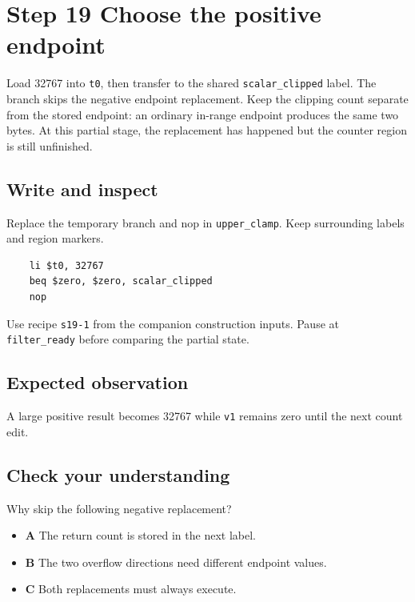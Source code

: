 \section{Step 19 Choose the positive endpoint}\label{fir-s19}

Load 32767 into \texttt{t0}, then transfer to the shared \texttt{scalar\_clipped} label. The branch skips the negative endpoint replacement. Keep the clipping count separate from the stored endpoint: an ordinary in-range endpoint produces the same two bytes. At this partial stage, the replacement has happened but the counter region is still unfinished.

\subsection{Write and inspect}
Replace the temporary branch and nop in \texttt{upper\_clamp}. Keep surrounding labels and region markers.

\begin{verbatim}
    li $t0, 32767
    beq $zero, $zero, scalar_clipped
    nop
\end{verbatim}
Use recipe \texttt{s19-1} from the companion construction inputs. Pause at \texttt{filter\_ready} before comparing the partial state.

\subsection{Expected observation}
A large positive result becomes 32767 while \texttt{v1} remains zero until the next count edit.

\subsection{Check your understanding}
Why skip the following negative replacement?

\begin{itemize}
  \item \textbf{A} The return count is stored in the next label.
  \item \textbf{B} The two overflow directions need different endpoint values.
  \item \textbf{C} Both replacements must always execute.
\end{itemize}
